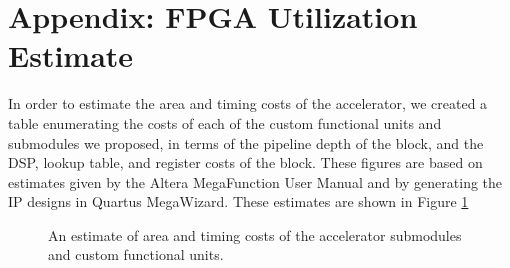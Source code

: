 \section{Appendix: FPGA Utilization Estimate}
In order to estimate the area and timing costs of the accelerator, we created a table enumerating the costs of each of the custom functional units and submodules we proposed, in terms of the pipeline depth of the block, and the DSP, lookup table, and register costs of the block. These figures are based on estimates given by the Altera MegaFunction User Manual and by generating the IP designs in Quartus MegaWizard. These estimates are shown in Figure \ref{fig:bill_of_materials}

\begin{figure}[ht]
\center
{}
\caption{An estimate of area and timing costs of the accelerator submodules and custom functional units.}
\label{fig:bill_of_materials}
\end{figure}
